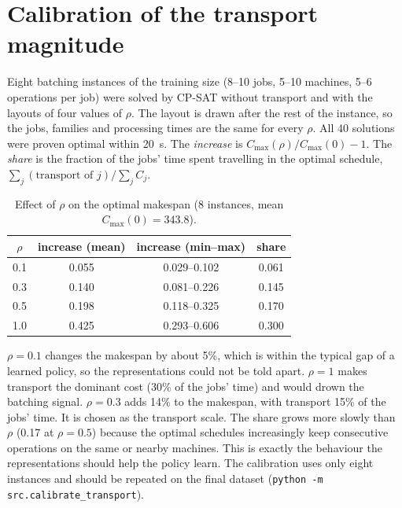 \documentclass[11pt,a4paper]{article}
\begin{document}
\section{Calibration of the transport magnitude}
\label{sec:calibration}

Eight batching instances of the training size (8--10 jobs, 5--10 machines, 5--6
operations per job) were solved by CP-SAT without transport and with the layouts
of four values of $\rho$. The layout is drawn after the rest of the instance, so
the jobs, families and processing times are the same for every $\rho$. All 40
solutions were proven optimal within 20~s. The \emph{increase} is
$C_{\max}(\rho)/C_{\max}(0)-1$. The \emph{share} is the fraction of the jobs'
time spent travelling in the optimal schedule,
$\sum_j(\text{transport of } j)/\sum_j C_j$.

\begin{table}[h]
\centering
\caption{Effect of $\rho$ on the optimal makespan (8 instances, mean $C_{\max}(0)=343.8$).}
\label{tab:calibration}
\begin{tabular}{c c c c}
\toprule
$\rho$ & increase (mean) & increase (min--max) & share \\
\midrule
0.1 & 0.055 & 0.029--0.102 & 0.061 \\
0.3 & 0.140 & 0.081--0.226 & 0.145 \\
0.5 & 0.198 & 0.118--0.325 & 0.170 \\
1.0 & 0.425 & 0.293--0.606 & 0.300 \\
\bottomrule
\end{tabular}
\end{table}

\noindent $\rho=0.1$ changes the makespan by about 5\%, which is within the
typical gap of a learned policy, so the representations could not be told apart.
$\rho=1$ makes transport the dominant cost (30\% of the jobs' time) and would
drown the batching signal. $\rho=0.3$ adds 14\% to the makespan, with transport
15\% of the jobs' time. It is chosen as the transport scale. The share grows
more slowly than $\rho$ (0.17 at $\rho=0.5$) because the optimal schedules
increasingly keep consecutive operations on the same or nearby machines. This is
exactly the behaviour the representations should help the policy learn. The
calibration uses only eight instances and should be repeated on the final
dataset (\texttt{python -m src.calibrate\_transport}).

\end{document}
